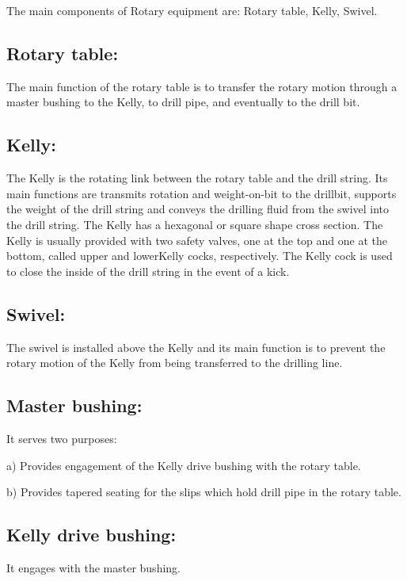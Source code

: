 The main components of Rotary equipment are: Rotary table, Kelly, Swivel.

\subsection*{\textbf{Rotary table:}} The main function of the rotary table is to transfer
 the rotary motion through a master bushing to the Kelly, to drill pipe, and eventually to the drill bit.

\vspace{1em}

\subsection*{\textbf{Kelly:}} The Kelly is the rotating link between the rotary table and the drill string.
 Its main functions are transmits rotation and weight-on-bit to the drillbit, supports the
weight of the drill string and conveys the drilling fluid from the swivel into the drill string.
The Kelly has a hexagonal or square shape cross section. The Kelly is usually 
provided with two safety valves, one at the top and one at the bottom, called upper and lowerKelly cocks,
 respectively. The Kelly cock is used to close the inside of the drill string in the event of a kick.
 
 \vspace{1em}
 
\subsection*{\textbf{Swivel:}} The swivel is installed above the Kelly and its main function 
is to prevent the rotary motion of the Kelly from being transferred to the drilling line. 
 
\vspace{1em}

\subsection*{\textbf{Master bushing:}} It serves two purposes:

    a) Provides engagement of the Kelly drive bushing with the rotary table.

    b) Provides tapered seating for the slips which hold drill pipe in the rotary table.

\vspace{1em}

\subsection*{\textbf{Kelly drive bushing:}} It engages with the master bushing.

